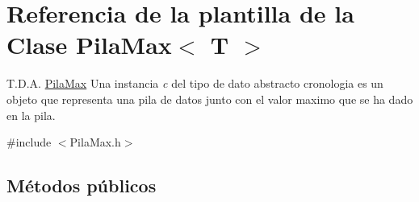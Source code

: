 \hypertarget{classPilaMax}{}\section{Referencia de la plantilla de la Clase Pila\+Max$<$ T $>$}
\label{classPilaMax}


T.\+D.\+A. \mbox{\hyperlink{classPilaMax}{Pila\+Max}} Una instancia {\itshape c} del tipo de dato abstracto {\ttfamily cronologia} es un objeto que representa una pila de datos junto con el valor maximo que se ha dado en la pila.  




{\ttfamily \#include $<$Pila\+Max.\+h$>$}

\subsection*{Métodos públicos}
